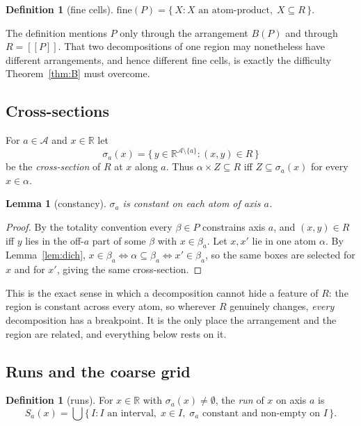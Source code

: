 \documentclass[11pt,a4paper]{article}
\theoremstyle{plain}
\newtheorem{lemma}[theorem]{Lemma}
\theoremstyle{definition}
\newtheorem{definition}[theorem]{Definition}
\theoremstyle{remark}
\newcommand{\R}{\mathbb{R}}
\newcommand{\sem}[1]{[\![#1]\!]}
\newcommand{\fine}{\mathrm{fine}}
\newcommand{\Ax}{\mathcal{A}}
\begin{document}
\begin{definition}[fine cells]\label{def:fine}
$\fine(P) = \{\, X : X \text{ an atom-product},\; X \subseteq R \,\}$.
\end{definition}

The definition mentions $P$ only through the arrangement $B(P)$ and through
$R = \sem{P}$. That two decompositions of one region may nonetheless have
different arrangements, and hence different fine cells, is exactly the difficulty
Theorem~\ref{thm:B} must overcome.

\subsection{Cross-sections}

For $a \in \Ax$ and $x \in \R$ let
\[
  \sigma_a(x) = \{\, y \in \R^{\Ax \setminus \{a\}} : (x,y) \in R \,\}
\]
be the \emph{cross-section} of $R$ at $x$ along $a$. Thus $\alpha \times Z
\subseteq R$ iff $Z \subseteq \sigma_a(x)$ for every $x \in \alpha$.

\begin{lemma}[constancy]\label{lem:const}
$\sigma_a$ is constant on each atom of axis $a$.
\end{lemma}

\begin{proof}
By the totality convention every $\beta \in P$ constrains axis $a$, and
$(x,y) \in R$ iff $y$ lies in the off-$a$ part of some $\beta$ with $x \in
\beta_a$. Let $x, x'$ lie in one atom $\alpha$. By Lemma~\ref{lem:dich},
$x \in \beta_a \iff \alpha \subseteq \beta_a \iff x' \in \beta_a$, so the same
boxes are selected for $x$ and for $x'$, giving the same cross-section.
\end{proof}

This is the exact sense in which a decomposition cannot hide a feature of $R$:
the region is constant across every atom, so wherever $R$ genuinely changes,
\emph{every} decomposition has a breakpoint. It is the only place the
arrangement and the region are related, and everything below rests on it.

\subsection{Runs and the coarse grid}

\begin{definition}[runs]\label{def:run}
For $x \in \R$ with $\sigma_a(x) \neq \emptyset$, the \emph{run} of $x$ on axis
$a$ is
\[
  S_a(x) = \bigcup \{\, I : I \text{ an interval},\; x \in I,\;
  \sigma_a \text{ constant and non-empty on } I \,\}.
\]
\end{definition}
\end{document}
